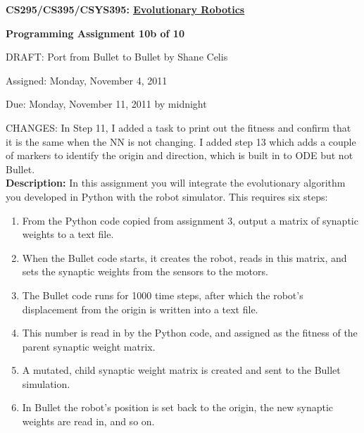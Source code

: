 \documentclass[12pt]{article}
\begin{document}
\centerline{\bf \Large CS295/CS395/CSYS395: \href{CS295_395_Syllabus.pdf}{\underline{Evolutionary Robotics}}}

\vspace{0.5cm}

\centerline{\bf \large Programming Assignment 10b of 10}
\vspace{0.25cm} \centerline{\color{red}DRAFT: Port from Bullet to Bullet by Shane Celis \color{black}}
\vspace{0.5cm}

\centerline{\large Assigned: Monday, November 4, 2011}

\vspace{0.5cm}

\centerline{\large Due: Monday, November 11, 2011 by midnight}

\vspace{0.5cm}
\noindent \color{red}CHANGES: In Step 11, I added a task to print out the fitness and confirm that it is the same when the NN is not changing.  I added step 13 which adds a couple of markers to identify the origin and direction, which is built in to ODE but not Bullet.  \color{black}\\
\noindent \textbf{Description:} In this assignment you will integrate the evolutionary algorithm you developed in Python with the robot simulator. This requires six steps:

\begin{enumerate}
\item From the Python code copied from assignment 3, output a matrix of synaptic weights to a text file.
\item When the Bullet code starts, it creates the robot, reads in this matrix, and sets the synaptic weights from the sensors to the motors.
\item The Bullet code runs for 1000 time steps, after which the robot's displacement from the origin is written into a text file.
\item This number is read in by the Python code, and assigned as the fitness of the parent synaptic weight matrix.
\item A mutated, child synaptic weight matrix is created and sent to the Bullet simulation.
\item In Bullet the robot's position is set back to the origin, the new synaptic weights are read in, and so on.
\end{enumerate}
\end{document}
